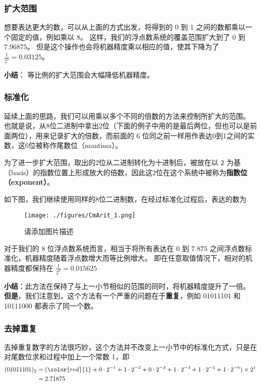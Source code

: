 \subsubsection{扩大范围}

想要表达更大的数，可以从上面的方式出发，将得到的 0 到 1 之间的数都乘以一个固定的值，例如乘以 8。 这样，我们的浮点数系统的覆盖范围扩大到了 $0$ 到 $7.96875$。 但是这个操作也会将机器精度乘以相应的值，使其下降为了  $\frac{1}{2^5}=0.03125$。

\textbf{小结}： 等比例的扩大范围会大幅降低机器精度。

\subsubsection{标准化}

延续上面的思路，我们可以用乘以多个不同的倍数的方法来控制所扩大的范围。 也就是说，从8位二进制中拿出2位（下面的例子中用的是最后两位，但也可以是前面两位），用来记录扩大的倍数，而前面的 6 位同之前一样用作表达0到1之间的实数，这6位被称作尾数位（mantissa）。 

为了进一步扩大范围，取出的2位从二进制转化为十进制后，被放在以 \verb|2| 为基（basis）的指数位置上形成放大的倍数，因此这2位在这个系统中被称为\textbf{指数位（exponent）}。

如下图，我们继续使用同样的8位二进制数，在经过标准化过程后，表达的数为

\begin{figure}[ht]
\centering
\texttt{[image: ./figures/CmArit\_1.png]}
\caption{请添加图片描述} \label{CmArit_fig1}
\end{figure}

对于我们的 8 位浮点数系统而言，相当于将所有表达在 $0$ 到 $7.875$ 之间浮点数标准化，机器精度随着浮点数增大而等比例增大。 即在任意取值情况下，相对的机器精度都保持在 $\frac{1}{2^6}=0.015625$

\textbf{小结}：此方法在保持了与上一小节相似的范围的同时，将机器精度提升了一倍。 \textbf{但是}，我们注意到，这个方法有一个严重的问题在于\textbf{重复}，例如 01011101 和 10111000 都表示了同一个数。

\subsubsection{去掉重复}

去掉重复数字的方法很巧妙，这个方法并不改变上一小节中的标准化方式，只是在对尾数位求和过程中加上一个常数 1，即
\begin{equation}
\begin{aligned}
(01011101)_2 &=({\color{red}{1}}+0\cdot2^{-1}+1\cdot2^{-2}+0\cdot2^{-3}+1\cdot2^{-4}+1\cdot2^{-5}+1\cdot2^{-6})\times2^1\\
&= 2.71875
\end{aligned}
\end{equation}

